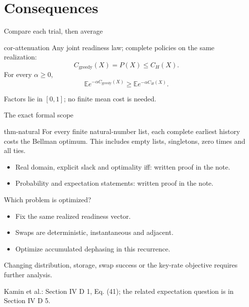 \documentclass{beamer}
\begin{document}
\section{Consequences}
\begin{frame}{Compare each trial, then average}
\begin{bookresult}{cor-attenuation}
Any joint readiness law; complete policies on the same realization:
\[
C_{\mathrm{greedy}}(X)=P(X)\leq C_H(X).
\]
For every $\alpha\geq0$,
\[
\mathbb E e^{-\alpha C_{\mathrm{greedy}}(X)}
\geq \mathbb E e^{-\alpha C_H(X)}.
\]
\end{bookresult}
Factors lie in $[0,1]$; no finite mean cost is needed.
\end{frame}
\begin{frame}{The exact formal scope}
\begin{bookresult}{thm-natural}
For every finite natural-number list, each complete earliest history costs the Bellman optimum. This includes empty lists, singletons, zero times and all ties.
\end{bookresult}
\begin{itemize}
\item Real domain, explicit slack and optimality iff: written proof in the note.
\item Probability and expectation statements: written proof in the note.
\end{itemize}
\end{frame}
\begin{frame}{Which problem is optimized?}
\begin{itemize}
\item Fix the same realized readiness vector.
\item Swaps are deterministic, instantaneous and adjacent.
\item Optimize accumulated dephasing in this recurrence.
\end{itemize}

Changing distribution, storage, swap success or the key-rate objective requires further analysis.

\medskip
Kamin et al.: Section IV D 1, Eq. (41); the related expectation question is in Section IV D 5.
\end{frame}
\end{document}

